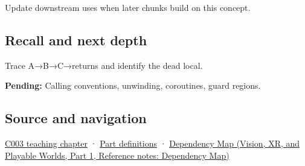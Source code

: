 \hypertarget{appendix-b081b7abe193-used-by}{}

Update downstream uses when later chunks build on this concept.

\subsection{Recall and next depth}\label{appendix-b081b7abe193-recall-and-next-depth}

\hypertarget{appendix-b081b7abe193-recall-and-next-depth}{}

Trace A→B→C→returns and identify the dead local.

\textbf{Pending:} Calling conventions, unwinding, coroutines, guard regions.

\subsection{Source and navigation}\label{appendix-b081b7abe193-source-and-navigation}

\hypertarget{appendix-b081b7abe193-source-and-navigation}{}

\hyperref[01-foundations-i-ch002-where-the-bytes-live]{C003 teaching chapter} · \hyperref[appendix-fd090d982a15-m003---parts-41-60]{Part definitions} · \href{../07-Vision-XR-and-Playable-Worlds-P01/main.pdf\#appendix-4ad47bdd269a}{Dependency Map (Vision, XR, and Playable Worlds, Part 1, Reference notes: Dependency Map)}
